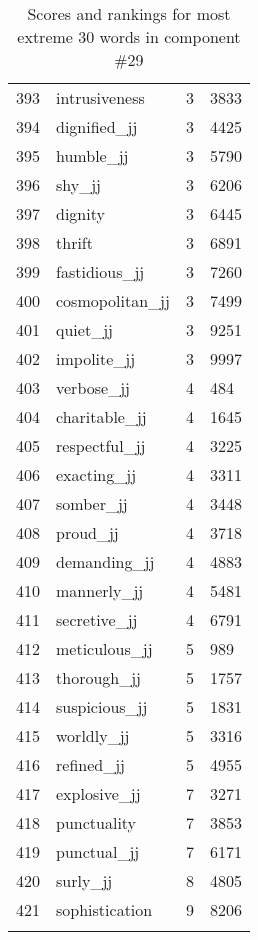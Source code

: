 \begin{longtable}[!htbp]{| rlr@{.}l |}
    393 & intrusiveness & 3 & 3833 \\
    394 & dignified\_jj & 3 & 4425 \\
    395 & humble\_jj & 3 & 5790 \\
    396 & shy\_jj & 3 & 6206 \\
    397 & dignity & 3 & 6445 \\
    398 & thrift & 3 & 6891 \\
    399 & fastidious\_jj & 3 & 7260 \\
    400 & cosmopolitan\_jj & 3 & 7499 \\
    401 & quiet\_jj & 3 & 9251 \\
    402 & impolite\_jj & 3 & 9997 \\
    403 & verbose\_jj & 4 & 484 \\
    404 & charitable\_jj & 4 & 1645 \\
    405 & respectful\_jj & 4 & 3225 \\
    406 & exacting\_jj & 4 & 3311 \\
    407 & somber\_jj & 4 & 3448 \\
    408 & proud\_jj & 4 & 3718 \\
    409 & demanding\_jj & 4 & 4883 \\
    410 & mannerly\_jj & 4 & 5481 \\
    411 & secretive\_jj & 4 & 6791 \\
    412 & meticulous\_jj & 5 & 989 \\
    413 & thorough\_jj & 5 & 1757 \\
    414 & suspicious\_jj & 5 & 1831 \\
    415 & worldly\_jj & 5 & 3316 \\
    416 & refined\_jj & 5 & 4955 \\
    417 & explosive\_jj & 7 & 3271 \\
    418 & punctuality & 7 & 3853 \\
    419 & punctual\_jj & 7 & 6171 \\
    420 & surly\_jj & 8 & 4805 \\
    421 & sophistication & 9 & 8206 \\
    \hline
    \caption{Scores and rankings for most extreme 30 words in component \#29} \\
\end{longtable}
